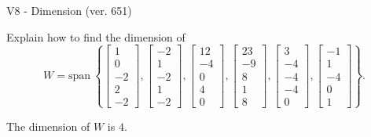 \begin{exercise}
  \begin{exerciseTitle}V8 - Dimension (ver. 651)\end{exerciseTitle}
  \begin{exerciseStatement}
    Explain how to find the dimension of 
\[W=\mathrm{span}\ \left\{\left[\begin{array}{r}
1 \\
0 \\
-2 \\
2 \\
-2
\end{array}\right] , \left[\begin{array}{r}
-2 \\
1 \\
-2 \\
1 \\
-2
\end{array}\right] , \left[\begin{array}{r}
12 \\
-4 \\
0 \\
4 \\
0
\end{array}\right] , \left[\begin{array}{r}
23 \\
-9 \\
8 \\
1 \\
8
\end{array}\right] , \left[\begin{array}{r}
3 \\
-4 \\
-4 \\
-4 \\
0
\end{array}\right] , \left[\begin{array}{r}
-1 \\
1 \\
-4 \\
0 \\
1
\end{array}\right]\right\}.\]



  \end{exerciseStatement}
  \begin{exerciseAnswer}
   The dimension of \(W\) is  \(4\).
  


  \end{exerciseAnswer}
\end{exercise}